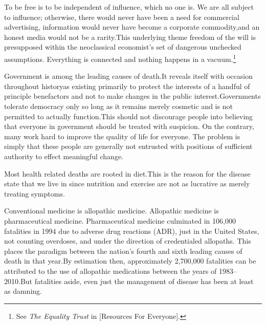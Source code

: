 
To be free is to be independent of influence, which no one is. We are all subject to influence; otherwise, there would never have been a need for commercial advertising, information would never have become a corporate commodity,\footnotecite[santoso2008]\footnotecite[nagata2011] and an honest media would not be a rarity. This underlying theme freedom of the will is presupposed within the neoclassical economist's set of dangerous unchecked assumptions. Everything is connected and nothing happens in a vacuum.\footnotecite[drum2013]\footnote{See {\it The Equality Trust} in [Resources For Everyone].} 


Government is among the leading causes of death. It reveals itself with occasion throughout history\footnotecite[wilson2007]\footnotecite[favel2008]\footnotecite[bowie2012] as existing primarily to protect the interests of a handful of principle benefactors and not to make changes in the public interest. Governments tolerate democracy only so long as it remains merely cosmetic and is not permitted to actually function. This should not discourage people into believing that everyone in government should be treated with suspicion. On the contrary, many work hard to improve the quality of life for everyone. The problem is simply that these people are generally not entrusted with positions of sufficient authority to effect meaningful change.


Most health related deaths are rooted in diet. This is the reason for the disease state that we live in since nutrition and exercise are not as lucrative as merely treating symptoms.


Conventional medicine is allopathic medicine. Allopathic medicine is pharmaceutical medicine. Pharmaceutical medicine culminated in 106,000 fatalities in 1994 due to adverse drug reactions (ADR), just in the United States, not counting overdoses, and under the direction of credentialed allopaths. This places the paradigm between the nation's fourth and sixth leading causes of death in that year. By estimation then, approximately 2,700,000 fatalities can be attributed to the use of allopathic medications between the years of 1983--2010. But fatalities aside, even just the management of disease has been at least as damning.\footnotecite[leape2000]


